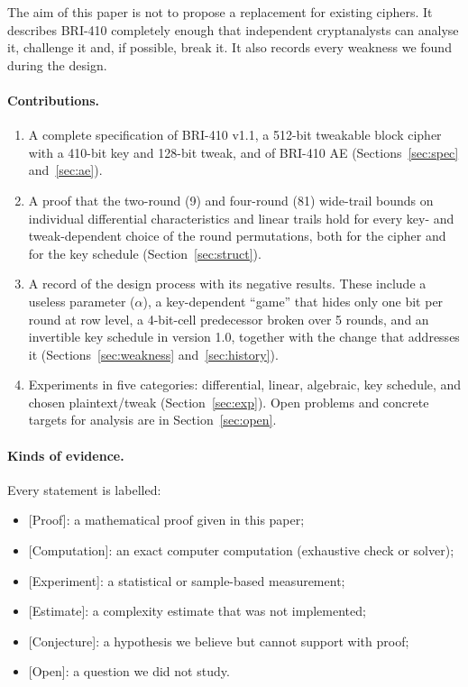 \documentclass[11pt,a4paper]{article}
\newcommand{\ev}[1]{\textup{\textsf{[#1]}}}
\begin{document}
The aim of this paper is not to propose a replacement for existing ciphers. It describes BRI-410 completely
enough that independent cryptanalysts can analyse it, challenge it and, if possible, break it. It also records
every weakness we found during the design.

\paragraph{Contributions.}
\begin{enumerate}
\item A complete specification of BRI-410 v1.1, a 512-bit tweakable block cipher with a 410-bit key and
  128-bit tweak, and of BRI-410 AE (Sections~\ref{sec:spec} and~\ref{sec:ae}).
\item A proof that the two-round (9) and four-round (81) wide-trail bounds on individual differential
  characteristics and linear trails hold for every key- and tweak-dependent choice of the round permutations,
  both for the cipher and for the key schedule (Section~\ref{sec:struct}).
\item A record of the design process with its negative results. These include a useless parameter ($\alpha$),
  a key-dependent ``game'' that hides only one bit per round at row level, a 4-bit-cell predecessor broken over
  5 rounds, and an invertible key schedule in version 1.0, together with the change that addresses it
  (Sections~\ref{sec:weakness} and~\ref{sec:history}).
\item Experiments in five categories: differential, linear, algebraic, key schedule, and chosen
  plaintext/tweak (Section~\ref{sec:exp}). Open problems and concrete targets for analysis are in
  Section~\ref{sec:open}.
\end{enumerate}

\paragraph{Kinds of evidence.} Every statement is labelled:
\begin{itemize}
\item \ev{Proof}: a mathematical proof given in this paper;
\item \ev{Computation}: an exact computer computation (exhaustive check or solver);
\item \ev{Experiment}: a statistical or sample-based measurement;
\item \ev{Estimate}: a complexity estimate that was not implemented;
\item \ev{Conjecture}: a hypothesis we believe but cannot support with proof;
\item \ev{Open}: a question we did not study.
\end{itemize}
\end{document}
